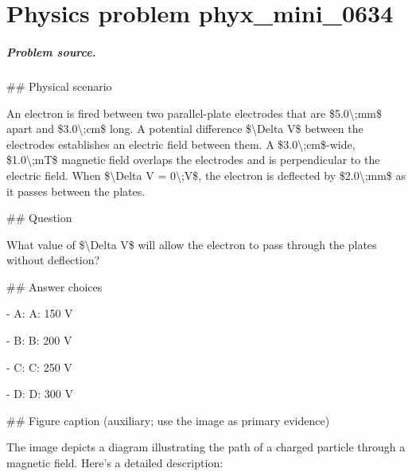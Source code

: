 
\chapter{Physics problem phyx\_mini\_0634}
\label{ch:PhyXMiniProblems_problem_phyx_mini_0634}

\paragraph{Problem source.}
\#\# Physical scenario

An electron is fired between two parallel-plate electrodes that are \$5.0\textbackslash{};mm\$ apart and \$3.0\textbackslash{};cm\$ long. A potential difference \$\textbackslash{}Delta V\$ between the electrodes establishes an electric field between them. A \$3.0\textbackslash{};cm\$-wide, \$1.0\textbackslash{};mT\$ magnetic field overlaps the electrodes and is perpendicular to the electric field. When \$\textbackslash{}Delta V = 0\textbackslash{};V\$, the electron is deflected by \$2.0\textbackslash{};mm\$ as it passes between the plates.

\#\# Question

What value of \$\textbackslash{}Delta V\$ will allow the electron to pass through the plates without deflection?

\#\# Answer choices

- A: A: 150 V

- B: B: 200 V

- C: C: 250 V

- D: D: 300 V

\#\# Figure caption (auxiliary; use the image as primary evidence)

The image depicts a diagram illustrating the path of a charged particle through a magnetic field. Here's a detailed description:


